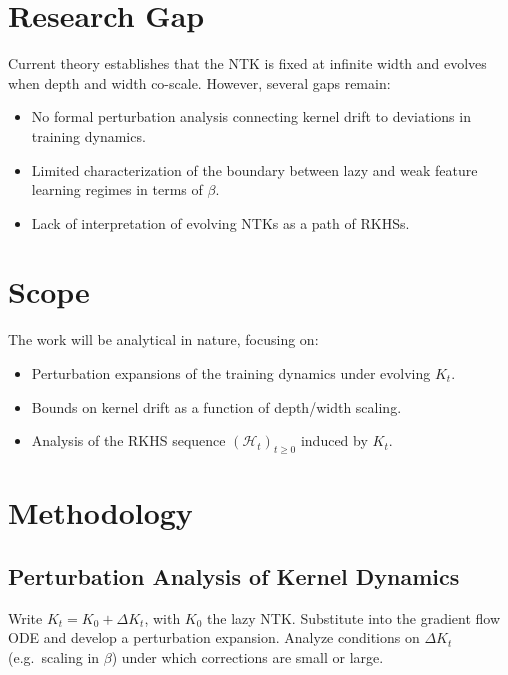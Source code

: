 \documentclass[11pt,a4paper]{article}
\begin{document}
\section{Research Gap}
Current theory establishes that the NTK is fixed at infinite width and evolves when depth and width co-scale.
However, several gaps remain:
\begin{itemize}
	\item No formal perturbation analysis connecting kernel drift to deviations in training dynamics.
	\item Limited characterization of the boundary between lazy and weak feature learning regimes in terms of $\beta$.
	\item Lack of interpretation of evolving NTKs as a path of RKHSs.
\end{itemize}

\section{Scope}
The work will be analytical in nature, focusing on:
\begin{itemize}
	\item Perturbation expansions of the training dynamics under evolving $K_t$.
	\item Bounds on kernel drift as a function of depth/width scaling.
	\item Analysis of the RKHS sequence $(\mathcal H_t)_{t\geq0}$ induced by $K_t$.
\end{itemize}

\section{Methodology}
\subsection{Perturbation Analysis of Kernel Dynamics}
Write $K_t = K_0 + \Delta K_t$, with $K_0$ the lazy NTK.
Substitute into the gradient flow ODE and develop a perturbation expansion.
Analyze conditions on $\Delta K_t$ (e.g.\ scaling in $\beta$) under which corrections are small or large.
%
\end{document}
